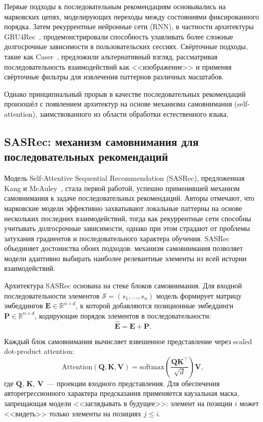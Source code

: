 Первые подходы к последовательным рекомендациям основывались на марковских цепях, моделирующих переходы между состояниями фиксированного порядка. Затем рекуррентные нейронные сети (RNN), в частности архитектуры GRU4Rec~\cite{hidasi2016session}, продемонстрировали способность улавливать более сложные долгосрочные зависимости в пользовательских сессиях. Свёрточные подходы, такие как Caser~\cite{tang2018caser}, предложили альтернативный взгляд, рассматривая последовательность взаимодействий как <<изображение>> и применяя свёрточные фильтры для извлечения паттернов различных масштабов.

Однако принципиальный прорыв в качестве последовательных рекомендаций произошёл с появлением архитектур на основе механизма самовнимания (self-attention), заимствованного из области обработки естественного языка.

\subsection{SASRec: механизм самовнимания для последовательных рекомендаций}

Модель Self-Attentive Sequential Recommendation (SASRec), предложенная Kang и McAuley~\cite{sasrec2018}, стала первой работой, успешно применившей механизм самовнимания к задаче последовательных рекомендаций. Авторы отмечают, что марковские модели эффективно захватывают локальные паттерны на основе нескольких последних взаимодействий, тогда как рекуррентные сети способны учитывать долгосрочные зависимости, однако при этом страдают от проблемы затухания градиентов и последовательного характера обучения. SASRec объединяет достоинства обоих подходов: механизм самовнимания позволяет модели адаптивно выбирать наиболее релевантные элементы из всей истории взаимодействий.

Архитектура SASRec основана на стеке блоков самовнимания. Для входной последовательности элементов $\mathcal{S} = (s_1, \ldots, s_n)$ модель формирует матрицу эмбеддингов $\mathbf{E} \in \mathbb{R}^{n \times d}$, к которой добавляются позиционные эмбеддинги $\mathbf{P} \in \mathbb{R}^{n \times d}$, кодирующие порядок элементов в последовательности:
\begin{equation}
    \hat{\mathbf{E}} = \mathbf{E} + \mathbf{P}.
\end{equation}

Каждый блок самовнимания вычисляет взвешенное представление через scaled dot-product attention:
\begin{equation}
    \mathrm{Attention}(\mathbf{Q}, \mathbf{K}, \mathbf{V}) = \mathrm{softmax}\!\left(\frac{\mathbf{Q}\mathbf{K}^\top}{\sqrt{d}}\right)\mathbf{V},
\end{equation}
где $\mathbf{Q}$, $\mathbf{K}$, $\mathbf{V}$~--- проекции входного представления. Для обеспечения авторегрессионного характера предсказания применяется каузальная маска, запрещающая модели <<заглядывать в будущее>>: элемент на позиции $i$ может <<видеть>> только элементы на позициях $j \leq i$.

